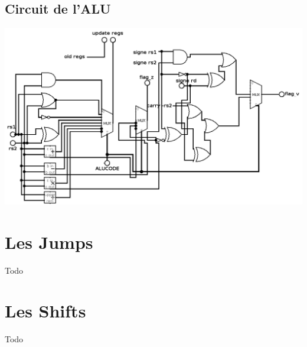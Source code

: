 \documentclass[french, 12pt]{article}
\begin{document}
\subsection*{Circuit de l'ALU}

\includegraphics[width=17cm]{circuit_alu.png}

\section*{Les Jumps}

Todo

\section*{Les Shifts}

Todo
\end{document}
